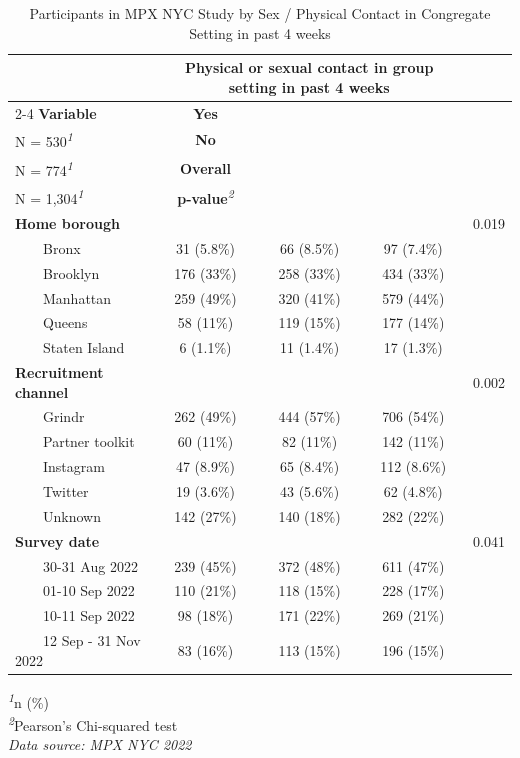 \documentclass[
  letterpaper,
  DIV=11,
  numbers=noendperiod,
  oneside]{scrreprt}
\begin{document}
\hypertarget{tbl-recruitment}{}
\setlength{\LTpost}{0mm}
\begin{longtable}{lcccc}
\caption{\label{tbl-recruitment}Participants in MPX NYC Study by Sex / Physical Contact in Congregate
Setting in past 4 weeks }\tabularnewline

\toprule
 & \multicolumn{3}{c}{\textbf{Physical or sexual contact in group setting in past 4 weeks}} &  \\ 
\cmidrule(lr){2-4}
\textbf{Variable} & \textbf{Yes}\\
N = 530\textsuperscript{\textit{1}} & \textbf{No}\\
N = 774\textsuperscript{\textit{1}} & \textbf{Overall}\\
N = 1,304\textsuperscript{\textit{1}} & \textbf{p-value}\textsuperscript{\textit{2}} \\ 
\midrule\addlinespace[2.5pt]
\textbf{Home borough} &  &  &  & 0.019 \\ 
    Bronx & 31 (5.8\%) & 66 (8.5\%) & 97 (7.4\%) &  \\ 
    Brooklyn & 176 (33\%) & 258 (33\%) & 434 (33\%) &  \\ 
    Manhattan & 259 (49\%) & 320 (41\%) & 579 (44\%) &  \\ 
    Queens & 58 (11\%) & 119 (15\%) & 177 (14\%) &  \\ 
    Staten Island & 6 (1.1\%) & 11 (1.4\%) & 17 (1.3\%) &  \\ 
\textbf{Recruitment channel} &  &  &  & 0.002 \\ 
    Grindr & 262 (49\%) & 444 (57\%) & 706 (54\%) &  \\ 
    Partner toolkit & 60 (11\%) & 82 (11\%) & 142 (11\%) &  \\ 
    Instagram & 47 (8.9\%) & 65 (8.4\%) & 112 (8.6\%) &  \\ 
    Twitter & 19 (3.6\%) & 43 (5.6\%) & 62 (4.8\%) &  \\ 
    Unknown & 142 (27\%) & 140 (18\%) & 282 (22\%) &  \\ 
\textbf{Survey date} &  &  &  & 0.041 \\ 
    30-31 Aug 2022 & 239 (45\%) & 372 (48\%) & 611 (47\%) &  \\ 
    01-10 Sep 2022 & 110 (21\%) & 118 (15\%) & 228 (17\%) &  \\ 
    10-11 Sep 2022 & 98 (18\%) & 171 (22\%) & 269 (21\%) &  \\ 
    12 Sep - 31 Nov 2022 & 83 (16\%) & 113 (15\%) & 196 (15\%) &  \\ 
\bottomrule
\end{longtable}
\begin{minipage}{\linewidth}
\textsuperscript{\textit{1}}n (\%)\\
\textsuperscript{\textit{2}}Pearson's Chi-squared test\\
\emph{Data source: MPX NYC 2022}\\
\end{minipage}
\end{document}
